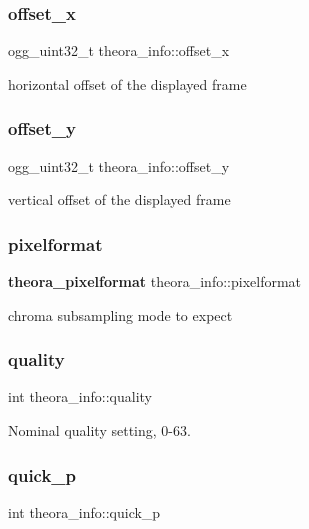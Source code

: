 \subsubsection{offset\+\_\+x}
{\footnotesize\ttfamily ogg\+\_\+uint32\+\_\+t theora\+\_\+info\+::offset\+\_\+x}



horizontal offset of the displayed frame 

\mbox{\label{structtheora__info_a91c3922097ba32a85acd584a01dc2c93}} 
\subsubsection{offset\+\_\+y}
{\footnotesize\ttfamily ogg\+\_\+uint32\+\_\+t theora\+\_\+info\+::offset\+\_\+y}



vertical offset of the displayed frame 

\mbox{\label{structtheora__info_a65ab4376ab5242ee82e06c78fb7008ab}} 
\subsubsection{pixelformat}
{\footnotesize\ttfamily \textbf{ theora\+\_\+pixelformat} theora\+\_\+info\+::pixelformat}



chroma subsampling mode to expect 

\mbox{\label{structtheora__info_a71a4748a5f31bd58d0e403b7806c980d}} 
\subsubsection{quality}
{\footnotesize\ttfamily int theora\+\_\+info\+::quality}



Nominal quality setting, 0-\/63. 

\mbox{\label{structtheora__info_a2dfae4fd175dbd19254eaf0697778ff5}} 
\subsubsection{quick\+\_\+p}
{\footnotesize\ttfamily int theora\+\_\+info\+::quick\+\_\+p}



